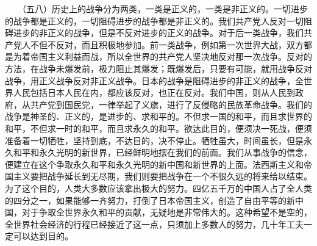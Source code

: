 \documentclass[cn,11pt,chinese]{elegantbook}
\begin{document}
　　（五八）历史上的战争分为两类，一类是正义的，一类是非正义的。一切进步的战争都是正义的，一切阻碍进步的战争都是非正义的。我们共产党人反对一切阻碍进步的非正义的战争，但是不反对进步的正义的战争。对于后一类战争，我们共产党人不但不反对，而且积极地参加。前一类战争，例如第一次世界大战，双方都是为着帝国主义利益而战，所以全世界的共产党人坚决地反对那一次战争。反对的方法，在战争未爆发前，极力阻止其爆发；既爆发后，只要有可能，就用战争反对战争，用正义战争反对非正义战争。日本的战争是阻碍进步的非正义的战争，全世界人民包括日本人民在内，都应该反对，也正在反对。我们中国，则从人民到政府，从共产党到国民党，一律举起了义旗，进行了反侵略的民族革命战争。我们的战争是神圣的、正义的，是进步的、求和平的。不但求一国的和平，而且求世界的和平，不但求一时的和平，而且求永久的和平。欲达此目的，便须决一死战，便须准备着一切牺牲，坚持到底，不达目的，决不停止。牺牲虽大，时间虽长，但是永久和平和永久光明的新世界，已经鲜明地摆在我们的前面。我们从事战争的信念，便建立在这个争取永久和平和永久光明的新中国和新世界的上面。法西斯主义和帝国主义要把战争延长到无尽期，我们则要把战争在一个不很久远的将来给以结束。为了这个目的，人类大多数应该拿出极大的努力。四亿五千万的中国人占了全人类的四分之一，如果能够一齐努力，打倒了日本帝国主义，创造了自由平等的新中国，对于争取全世界永久和平的贡献，无疑地是非常伟大的。这种希望不是空的，全世界社会经济的行程已经接近了这一点，只须加上多数人的努力，几十年工夫一定可以达到目的。\\
\end{document}
